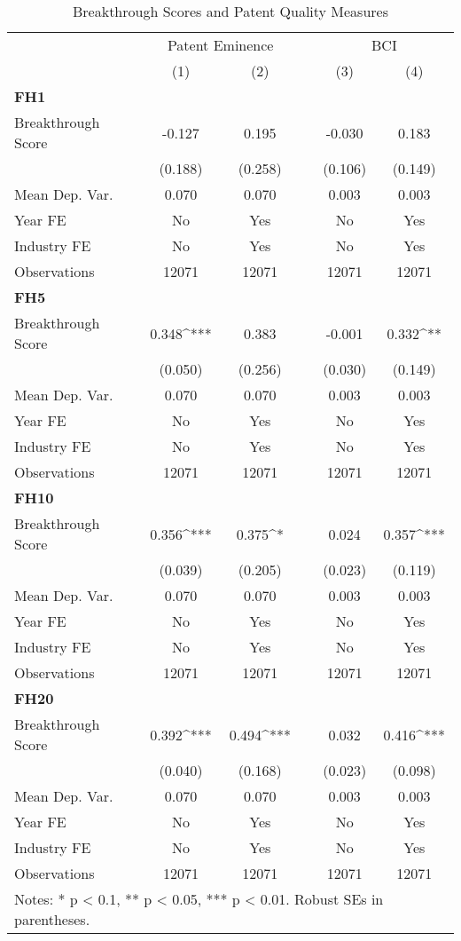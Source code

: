 \begin{table}[H]
\setlength{\tabcolsep}{4pt}
\def\arraystretch{0.9}  
\caption{Breakthrough Scores and Patent Quality Measures}
\centering 
\begin{tabular}{lccccc}
\hline\hline
& \multicolumn{2}{c}{Patent Eminence} && \multicolumn{2}{c}{BCI} \\
& (1) & (2) && (3) & (4) \\
\hline
\multicolumn{6}{l}{\textbf{FH1}}\\
Breakthrough Score & -0.127 & 0.195 && -0.030 & 0.183 \\
& (0.188) & (0.258) & &(0.106) & (0.149)\\
Mean Dep. Var. & 0.070 & 0.070 && 0.003 & 0.003\\
Year FE & No & Yes && No & Yes \\
Industry FE & No & Yes && No & Yes \\
Observations & 12071 & 12071 && 12071 & 12071\\
\hline
\multicolumn{6}{l}{\textbf{FH5}}\\
Breakthrough Score & 0.348^{***} & 0.383 && -0.001 & 0.332^{**} \\
& (0.050) & (0.256) & &(0.030) & (0.149)\\
Mean Dep. Var. & 0.070 & 0.070 && 0.003 & 0.003\\
Year FE & No & Yes && No & Yes \\
Industry FE & No & Yes && No & Yes \\
Observations & 12071 & 12071 && 12071 & 12071\\
\hline
\multicolumn{6}{l}{\textbf{FH10}}\\
Breakthrough Score & 0.356^{***} & 0.375^{*} && 0.024 & 0.357^{***} \\
& (0.039) & (0.205) & &(0.023) & (0.119)\\
Mean Dep. Var. & 0.070 & 0.070 && 0.003 & 0.003\\
Year FE & No & Yes && No & Yes \\
Industry FE & No & Yes && No & Yes \\
Observations & 12071 & 12071 && 12071 & 12071\\
\hline
\multicolumn{6}{l}{\textbf{FH20}}\\
Breakthrough Score & 0.392^{***} & 0.494^{***} && 0.032 & 0.416^{***} \\
& (0.040) & (0.168) & &(0.023) & (0.098)\\
Mean Dep. Var. & 0.070 & 0.070 && 0.003 & 0.003\\
Year FE & No & Yes && No & Yes \\
Industry FE & No & Yes && No & Yes \\
Observations & 12071 & 12071 && 12071 & 12071\\
\hline
\hline
\multicolumn{6}{l}{\footnotesize{Notes: * p < 0.1, ** p < 0.05, *** p < 0.01. Robust SEs in parentheses.}} \\
\end{tabular}
\end{table}